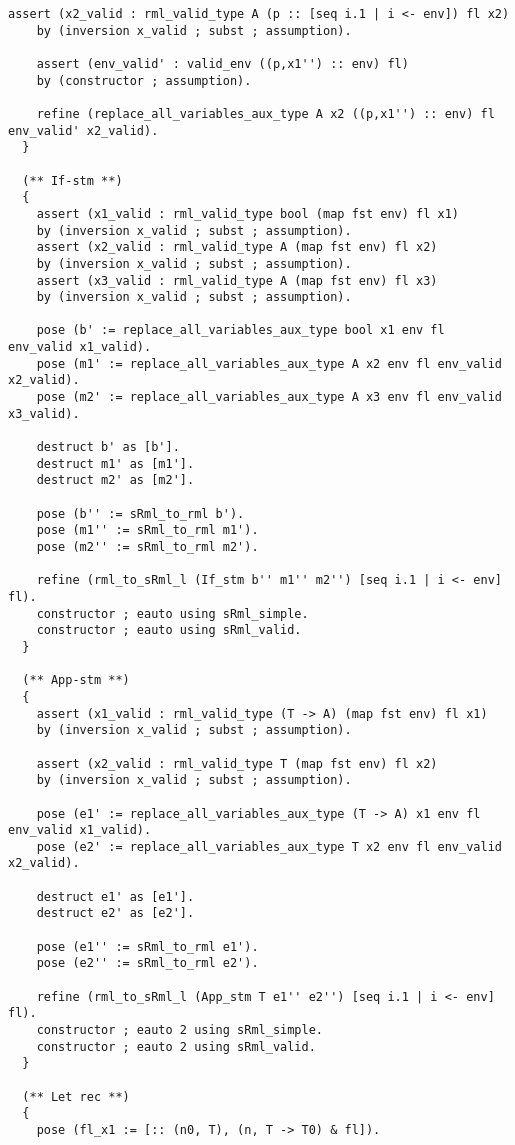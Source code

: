 \documentclass[11pt, leqno, titlepage]{article}
\theoremstyle{definition}
\begin{document}
\begin{appendices}
\begin{lstlisting}[language=coq]
    assert (x2_valid : rml_valid_type A (p :: [seq i.1 | i <- env]) fl x2) 
    by (inversion x_valid ; subst ; assumption).

    assert (env_valid' : valid_env ((p,x1'') :: env) fl) 
    by (constructor ; assumption).
    
    refine (replace_all_variables_aux_type A x2 ((p,x1'') :: env) fl env_valid' x2_valid).
  }
    
  (** If-stm **)
  {
    assert (x1_valid : rml_valid_type bool (map fst env) fl x1) 
    by (inversion x_valid ; subst ; assumption).
    assert (x2_valid : rml_valid_type A (map fst env) fl x2) 
    by (inversion x_valid ; subst ; assumption).
    assert (x3_valid : rml_valid_type A (map fst env) fl x3) 
    by (inversion x_valid ; subst ; assumption).
    
    pose (b' := replace_all_variables_aux_type bool x1 env fl env_valid x1_valid).
    pose (m1' := replace_all_variables_aux_type A x2 env fl env_valid x2_valid).
    pose (m2' := replace_all_variables_aux_type A x3 env fl env_valid x3_valid).

    destruct b' as [b'].
    destruct m1' as [m1'].
    destruct m2' as [m2'].
    
    pose (b'' := sRml_to_rml b').
    pose (m1'' := sRml_to_rml m1').
    pose (m2'' := sRml_to_rml m2').
    
    refine (rml_to_sRml_l (If_stm b'' m1'' m2'') [seq i.1 | i <- env] fl).
    constructor ; eauto using sRml_simple.
    constructor ; eauto using sRml_valid.
  }

  (** App-stm **)
  {
    assert (x1_valid : rml_valid_type (T -> A) (map fst env) fl x1) 
    by (inversion x_valid ; subst ; assumption).
        
    assert (x2_valid : rml_valid_type T (map fst env) fl x2) 
    by (inversion x_valid ; subst ; assumption).
    
    pose (e1' := replace_all_variables_aux_type (T -> A) x1 env fl env_valid x1_valid).
    pose (e2' := replace_all_variables_aux_type T x2 env fl env_valid x2_valid).

    destruct e1' as [e1'].
    destruct e2' as [e2'].
    
    pose (e1'' := sRml_to_rml e1').
    pose (e2'' := sRml_to_rml e2').
    
    refine (rml_to_sRml_l (App_stm T e1'' e2'') [seq i.1 | i <- env] fl).
    constructor ; eauto 2 using sRml_simple.
    constructor ; eauto 2 using sRml_valid.
  }

  (** Let rec **)
  {
    pose (fl_x1 := [:: (n0, T), (n, T -> T0) & fl]).
    

\end{lstlisting}
\end{appendices}
\end{document}
